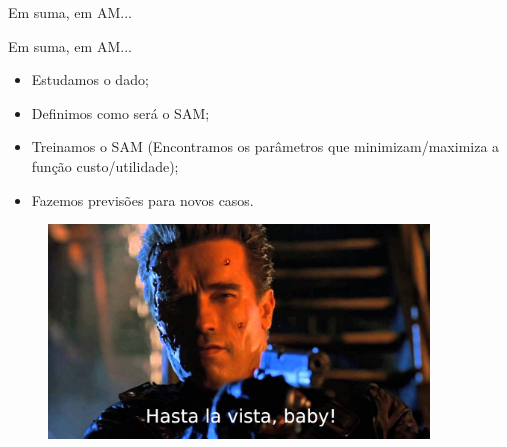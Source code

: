 \documentclass[12pt,mathserif,aspectratio=169]{beamer}
\begin{document}
\begin{frame}
	\Huge Em suma, em AM...
\end{frame}

\begin{frame}{Em suma, em AM...}
    \begin{itemize}
        \item Estudamos o dado;
        \item Definimos como será o SAM;
        \item Treinamos o SAM (Encontramos os parâmetros que minimizam/maximiza a função custo/utilidade);
        \item Fazemos previsões para novos casos.
    \end{itemize}
\end{frame}

\begin{frame}
    \begin{figure}
        \includegraphics[width=0.9\textwidth]{fig/hastalavistababy.jpg}
    \end{figure}
\end{frame}
\end{document}

